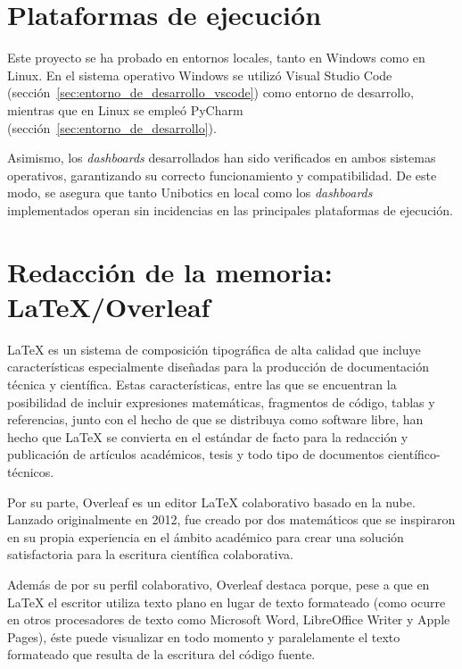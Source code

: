 \documentclass[a4paper, 12pt]{book}
\begin{document}
\section{Plataformas de ejecución}
\label{sec:plataformas_de_ejecucion}

Este proyecto se ha probado en entornos locales, tanto en Windows como en Linux.  
En el sistema operativo Windows se utilizó Visual Studio Code (sección~\ref{sec:entorno_de_desarrollo_vscode}) como entorno de desarrollo, mientras que en Linux se empleó PyCharm (sección~\ref{sec:entorno_de_desarrollo}).

Asimismo, los \textit{dashboards} desarrollados han sido verificados en ambos sistemas operativos, garantizando su correcto funcionamiento y compatibilidad.  
De este modo, se asegura que tanto Unibotics en local como los \textit{dashboards} implementados operan sin incidencias en las principales plataformas de ejecución.

\section{Redacción de la memoria: LaTeX/Overleaf}
\label{sec:redaccion_de_la_memoria}

LaTeX es un sistema de composición tipográfica de alta calidad que incluye características especialmente diseñadas para la producción de documentación técnica y científica. Estas características, entre las que se encuentran la posibilidad de incluir expresiones matemáticas, fragmentos de código, tablas y referencias, junto con el hecho de que se distribuya como software libre, han hecho que LaTeX se convierta en el estándar de facto para la redacción y publicación de artículos académicos, tesis y todo tipo de documentos científico-técnicos. 

Por su parte, Overleaf es un editor LaTeX colaborativo basado en la nube. Lanzado originalmente en 2012, fue creado por dos matemáticos que se inspiraron en su propia experiencia en el ámbito académico para crear una solución satisfactoria para la escritura científica colaborativa.

Además de por su perfil colaborativo, Overleaf destaca porque, pese a que en LaTeX el escritor utiliza texto plano en lugar de texto formateado (como ocurre en otros procesadores de texto como Microsoft Word, LibreOffice Writer y Apple Pages), éste puede visualizar en todo momento y paralelamente el texto formateado que resulta de la escritura del código fuente.


\cleardoublepage
\end{document}
